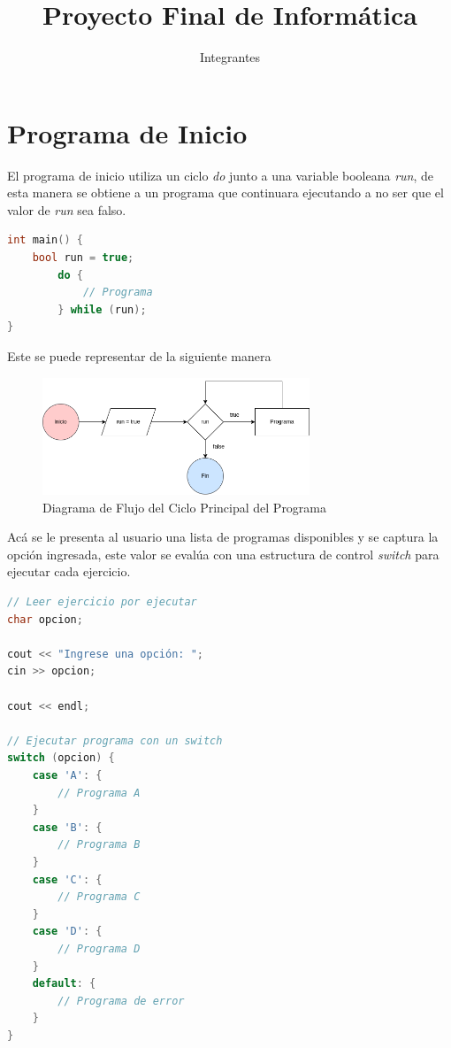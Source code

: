 \documentclass{article}
\title{Proyecto Final de Informática}
\author{Integrantes}
\begin{document}
    \maketitle
    \tableofcontents

\section{Programa de Inicio}

El programa de inicio utiliza un ciclo \emph{do} junto a una variable booleana \emph{run}, de esta manera se obtiene a un programa que continuara ejecutando a no ser que el valor de \emph{run} sea falso. 

\begin{lstlisting}[style=mystyle, language=c++]
int main() {
    bool run = true;
        do {
            // Programa
        } while (run);
}
\end{lstlisting}

Este se puede representar de la siguiente manera

\begin{figure}[H]
    \centering
        \centering
    \includegraphics[width=8cm]{loop_inicio}
    \centering
        \centering
        \caption{Diagrama de Flujo del Ciclo Principal del Programa}
\end{figure}

Acá se le presenta al usuario una lista de programas disponibles y se captura la opción ingresada, este valor se evalúa con una estructura de control \emph{switch} para ejecutar cada ejercicio.

\begin{lstlisting}[style=mystyle, language=c++]
// Leer ejercicio por ejecutar
char opcion;

cout << "Ingrese una opción: ";
cin >> opcion;

cout << endl;

// Ejecutar programa con un switch
switch (opcion) {
    case 'A': {
        // Programa A
    }
    case 'B': {
        // Programa B
    }
    case 'C': {
        // Programa C
    }
    case 'D': {
        // Programa D
    }
    default: {
        // Programa de error
    }
}
\end{lstlisting}
\end{document}
